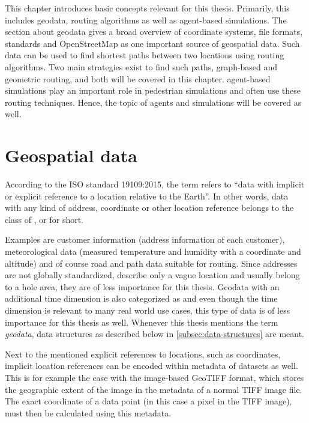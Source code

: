 
This chapter introduces basic concepts relevant for this thesis.
Primarily, this includes geodata, routing algorithms as well as agent-based simulations.
The section about geodata gives a broad overview of coordinate systems, file formats, standards and OpenStreetMap as one important source of geospatial data.
Such data can be used to find shortest paths between two locations using routing algorithms.
Two main strategies exist to find such paths, graph-based and geometric routing, and both will be covered in this chapter.
agent-based simulations play an important role in pedestrian simulations and often use these routing techniques.
Hence, the topic of agents and simulations will be covered as well.

\section{Geospatial data}

	According to the ISO standard 19109:2015\cite{iso-19109}, the term  refers to \enquote{data with implicit or explicit reference to a location relative to the Earth}.
	In other words, data with any kind of address, coordinate or other location reference belongs to the class of , or  for short.
	
	Examples are customer information (address information of each customer), meteorological data (measured temperature and humidity with a coordinate and altitude) and of course road and path data suitable for routing.
	Since addresses are not globally standardized, describe only a vague location and usually belong to a hole area, they are of less importance for this thesis.
	Geodata with an additional time dimension is also categorized as \cite{iso-19108} and even though the time dimension is relevant to many real world use cases, this type of data is of less importance for this thesis as well.
	Whenever this thesis mentions the term \emph{geodata}, data structures as described below in \cref{subsec:data-structures} are meant.
	
	Next to the mentioned explicit references to locations, such as coordinates, implicit location references can be encoded within metadata of datasets as well.
	This is for example the case with the image-based GeoTIFF format, which stores the geographic extent of the image in the metadata of a normal TIFF image file\cite{ogc-geotiff}.
	The exact coordinate of a data point (in this case a pixel in the TIFF image), must then be calculated using this metadata.

